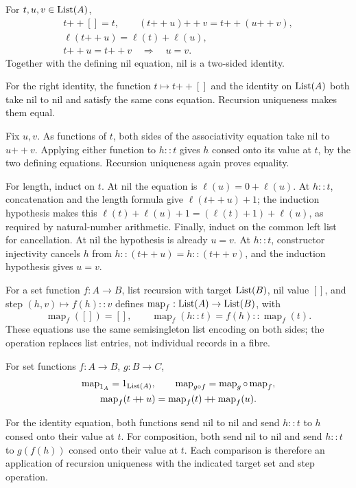 \begin{proposition}
For $t,u,v\in\mathrm{List}(A)$,
\[
\begin{gathered}
t\mathbin{+\!\!+}[]=t,\qquad
(t\mathbin{+\!\!+}u)\mathbin{+\!\!+}v
 =t\mathbin{+\!\!+}(u\mathbin{+\!\!+}v),\\
\ell(t\mathbin{+\!\!+}u)=\ell(t)+\ell(u),\\
t\mathbin{+\!\!+}u=t\mathbin{+\!\!+}v\quad\Longrightarrow\quad u=v.
\end{gathered}
\]
Together with the defining nil equation, nil is a two-sided identity.
\end{proposition}
\Proof
For the right identity, the function $t\mapsto t\mathbin{+\!\!+}[]$
and the identity on $\mathrm{List}(A)$ both take nil to nil and satisfy the
same cons equation. Recursion uniqueness makes them equal.

Fix $u,v$. As functions of $t$, both sides of the associativity equation
take nil to $u\mathbin{+\!\!+}v$. Applying either function to $h::t$
gives $h$ consed onto its value at $t$, by the two defining equations.
Recursion uniqueness again proves equality.

For length, induct on $t$. At nil the equation is
$\ell(u)=0+\ell(u)$. At $h::t$, concatenation and the length formula
give $\ell(t\mathbin{+\!\!+}u)+1$; the induction hypothesis makes
this $\ell(t)+\ell(u)+1=(\ell(t)+1)+\ell(u)$, as required by
natural-number arithmetic. Finally, induct on the common left list
for cancellation. At nil the hypothesis is already $u=v$.
At $h::t$, constructor injectivity cancels $h$ from
$h::(t\mathbin{+\!\!+}u)=h::(t\mathbin{+\!\!+}v)$, and the
induction hypothesis gives $u=v$.
\Done

For a set function $f:A\to B$, list recursion with target $\mathrm{List}(B)$,
nil value $[]$, and step $(h,v)\mapsto f(h)::v$ defines
$\operatorname{map}_f:\mathrm{List}(A)\to\mathrm{List}(B)$, with
\[
\operatorname{map}_f([])=[],\qquad
\operatorname{map}_f(h::t)=f(h)::\operatorname{map}_f(t).
\]
These equations use the same semisingleton list encoding on both sides;
the operation replaces list entries, not individual records in a fibre.

\begin{proposition}
For set functions $f:A\to B$, $g:B\to C$,
\[
\begin{gathered}
\operatorname{map}_{1_A}=1_{\mathrm{List}(A)},\qquad
\operatorname{map}_{g\circ f}=\operatorname{map}_g\circ\operatorname{map}_f,\\
\operatorname{map}_f(t\mathbin{+\!\!+}u)
 =\operatorname{map}_f(t)\mathbin{+\!\!+}\operatorname{map}_f(u).
\end{gathered}
\]
\end{proposition}
\Proof
For the identity equation, both functions send nil to nil and send
$h::t$ to $h$ consed onto their value at $t$. For composition, both
send nil to nil and send $h::t$ to $g(f(h))$ consed onto their value
at $t$. Each comparison is therefore an application of recursion
uniqueness with the indicated target set and step operation.


